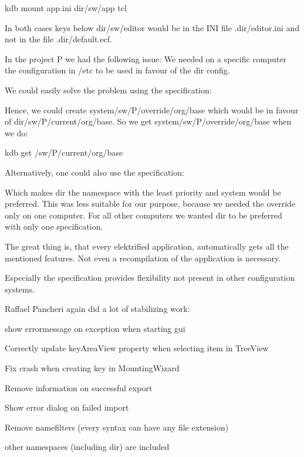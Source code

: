 \begin{DoxyCode}
kdb mount app.ini dir/sw/app tcl
\end{DoxyCode}


In both cases keys below dir/sw/editor would be in the I\+NI file {\ttfamily .dir/editor.\+ini} and not in the file {\ttfamily .dir/default.\+ecf}.

In the project P we had the following issue\+: We needed on a specific computer the configuration in /etc to be used in favour of the dir config.

We could easily solve the problem using the specification\+:




Hence, we could create system/sw/\+P/override/org/base which would be in favour of dir/sw/\+P/current/org/base. So we get system/sw/\+P/override/org/base when we do\+:


\begin{DoxyCode}
kdb get /sw/P/current/org/base
\end{DoxyCode}


Alternatively, one could also use the specification\+:




Which makes dir the namespace with the least priority and system would be preferred. This was less suitable for our purpose, because we needed the override only on one computer. For all other computers we wanted dir to be preferred with only one specification.

The great thing is, that every elektrified application, automatically gets all the mentioned features. Not even a recompilation of the application is necessary.

Especially the specification provides flexibility not present in other configuration systems.

Raffael Pancheri again did a lot of stabilizing work\+:


\begin{DoxyItemize}
\item show errormessage on exception when starting gui
\item Correctly update key\+Area\+View property when selecting item in Tree\+View
\item Fix crash when creating key in Mounting\+Wizard
\item Remove information on successful export
\item Show error dialog on failed import
\item Remove namefilters (every syntax can have any file extension)
\item other namespaces (including dir) are included
\end{DoxyItemize}

